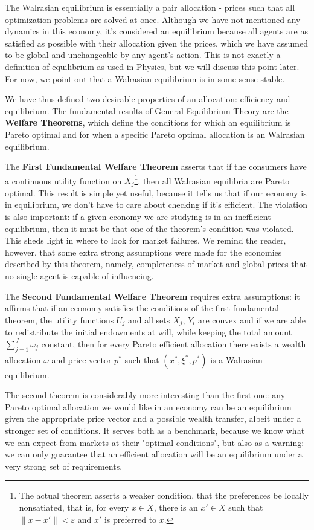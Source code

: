The Walrasian equilibrium is essentially a pair allocation - prices such that all optimization problems are solved at once. Although we have not mentioned any dynamics in this economy, it's considered an equilibrium because all agents are as satisfied as possible with their allocation given the prices, which we have assumed to be global and unchangeable by any agent's action. This is not exactly a definition of equilibrium as used in Physics, but we will discuss this point later. For now, we point out that a Walrasian equilibrium is in some sense stable.

We have thus defined two desirable properties of an allocation: efficiency and equilibrium. The fundamental results of General Equilibrium Theory are the \textbf{Welfare Theorems}, which define the conditions for which an equilibrium is Pareto optimal and for when a specific Pareto optimal allocation is an Walrasian equilibrium.

The \textbf{First Fundamental Welfare Theorem} asserts that if the consumers have a continuous utility function on $X_j$\footnote{The actual theorem   asserts a weaker condition, that the preferences be locally nonsatiated, that is, for every $x \in X$, there is an $x' \in X$   such that $\|x - x'\| < \varepsilon$ and $x'$ is preferred to $x$.}, then all Walrasian equilibria are Pareto optimal. This result is simple yet useful, because it tells us that if our economy is in equilibrium, we don't have to care about checking if it's efficient. The violation is also important: if a given economy we are studying is in an inefficient equilibrium, then it must be that one of the theorem's condition was violated. This sheds light in where to look for market failures. We remind the reader, however, that some extra strong assumptions were made for the economies described by this theorem, namely, completeness of market and global prices that no single agent is capable of influencing.

The \textbf{Second Fundamental Welfare Theorem} requires extra assumptions: it affirms that if an economy satisfies the conditions of the first fundamental theorem, the utility functions $U_j$ and all sets $X_j$, $Y_i$ are convex and if we are able to redistribute the initial endowments at will, while keeping the total amount $\sum_{j=1}^J \omega_j$ constant, then for every Pareto efficient allocation there exists a wealth allocation $\omega$ and price vector $p^\ast$ such that $(x^\ast, \xi^\ast, p^\ast)$ is a Walrasian equilibrium.

The second theorem is considerably more interesting than the first one: any Pareto optimal allocation we would like in an economy can be an equilibrium given the appropriate price vector and a possible wealth transfer, albeit under a stronger set of conditions. It serves both as a benchmark, because we know what we can expect from markets at their "optimal conditions", but also as a warning: we can only guarantee that an efficient allocation will be an equilibrium under a very strong set of requirements.


